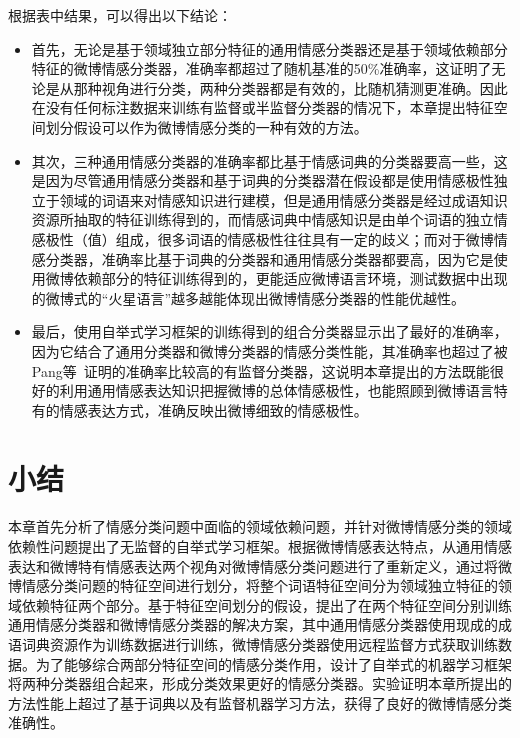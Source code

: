 根据表中结果，可以得出以下结论：
\begin{itemize}
\item 首先，无论是基于领域独立部分特征的通用情感分类器还是基于领域依赖部分特征的微博情感分类器，准确率都超过了随机基准的50\%准确率，这证明了无论是从那种视角进行分类，两种分类器都是有效的，比随机猜测更准确。因此在没有任何标注数据来训练有监督或半监督分类器的情况下，本章提出特征空间划分假设可以作为微博情感分类的一种有效的方法。
\item 其次，三种通用情感分类器的准确率都比基于情感词典的分类器要高一些，这是因为尽管通用情感分类器和基于词典的分类器潜在假设都是使用情感极性独立于领域的词语来对情感知识进行建模，但是通用情感分类器是经过成语知识资源所抽取的特征训练得到的，而情感词典中情感知识是由单个词语的独立情感极性（值）组成，很多词语的情感极性往往具有一定的歧义；而对于微博情感分类器，准确率比基于词典的分类器和通用情感分类器都要高，因为它是使用微博依赖部分的特征训练得到的，更能适应微博语言环境，测试数据中出现的微博式的“火星语言”越多越能体现出微博情感分类器的性能优越性。
\item 最后，使用自举式学习框架的训练得到的组合分类器显示出了最好的准确率，因为它结合了通用分类器和微博分类器的情感分类性能，其准确率也超过了被Pang等~证明的准确率比较高的有监督分类器，这说明本章提出的方法既能很好的利用通用情感表达知识把握微博的总体情感极性，也能照顾到微博语言特有的情感表达方式，准确反映出微博细致的情感极性。
\end{itemize}

\section{小结}
\label{conclusion}
本章首先分析了情感分类问题中面临的领域依赖问题，并针对微博情感分类的领域依赖性问题提出了无监督的自举式学习框架。根据微博情感表达特点，从通用情感表达和微博特有情感表达两个视角对微博情感分类问题进行了重新定义，通过将微博情感分类问题的特征空间进行划分，将整个词语特征空间分为领域独立特征的领域依赖特征两个部分。基于特征空间划分的假设，提出了在两个特征空间分别训练通用情感分类器和微博情感分类器的解决方案，其中通用情感分类器使用现成的成语词典资源作为训练数据进行训练，微博情感分类器使用远程监督方式获取训练数据。为了能够综合两部分特征空间的情感分类作用，设计了自举式的机器学习框架将两种分类器组合起来，形成分类效果更好的情感分类器。实验证明本章所提出的方法性能上超过了基于词典以及有监督机器学习方法，获得了良好的微博情感分类准确性。